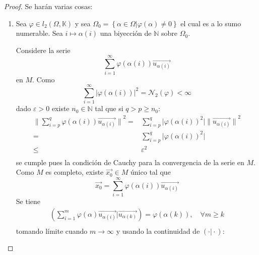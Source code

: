 \documentclass[12pt]{report}
\newcounter{it}
\theoremstyle{largebreak}
\newcommand\abs[1]{\ensuremath{\big|#1\big|}}
\newcommand\norm[1]{\ensuremath{\|#1\|}}
\newcommand\pint[2]{\ensuremath{\left(#1\big| #2\right)}}
\begin{document}
    \begin{proof}
        Se harán varias cosas:
        \begin{enumerate}
            \item Sea $\varphi\in l_2(\Omega,\mathbb{K})$ y sea $\Omega_0=\left\{\alpha\in\Omega\Big|\varphi(\alpha)\neq0 \right\}$ el cual es a lo sumo numerable. Sea $i\mapsto\alpha(i)$ una biyección de $\mathbb{N}$ sobre $\Omega_0$.
            
            Considere la serie
            \begin{equation*}
                \sum_{i=1} ^{\infty}\varphi(\alpha(i))\vec{u_{\alpha(i)}}
            \end{equation*}
            en $M$. Como
            \begin{equation*}
                \sum_{i=1}^{\infty}\abs{\varphi(\alpha(i))}^2=\mathcal{N}_2(\varphi)<\infty
            \end{equation*}
            dado $\varepsilon>0$ existe $n_0\in\mathbb{N}$ tal que si $q>p\geq n_0$:
            \begin{equation*}
                \begin{split}
                    \norm{\sum_{i=p }^{q}\varphi(\alpha(i))\vec{u_{\alpha(i)}}}^2
                    =&\sum_{i=p }^{q}\abs{\varphi(\alpha(i))^2}\norm{\vec{u_{\alpha(i)}}}^2 \\
                    =&\sum_{i=p }^{q}\abs{\varphi(\alpha(i))^2}\\
                    \leq&\varepsilon^2 \\
                \end{split}
            \end{equation*}
            se cumple pues la condición de Cauchy para la convergencia de la serie en $M$. Como $M$ es completo, existe $\vec{x_0}\in M$ único tal que
            \begin{equation*}
                \vec{x_0}=\sum_{i=1} ^{\infty}\varphi(\alpha(i))\vec{u_{\alpha(i)}}
            \end{equation*}
            Se tiene
            \begin{equation*}
                \begin{split}
                    \pint{\sum_{i=1 }^{m}\varphi(\alpha)\vec{u_{\alpha(i)}}}{\vec{u_{\alpha(k)}}}=\varphi(\alpha(k)),\quad\forall m\geq k \\
                \end{split}
            \end{equation*}
            tomando límite cuando $m\rightarrow\infty$ y usando la continuidad de $\pint{\cdot}{\cdot}$:

\end{enumerate}
\end{proof}
\end{document}

